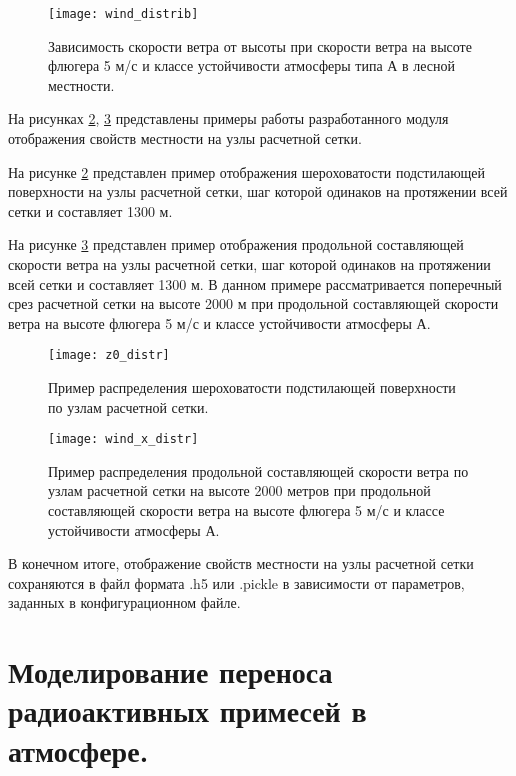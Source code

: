 \begin{figure}[ht]
    \centering
    \texttt{[image: wind\_distrib]}
    \captionsetup{justification=centering}
    \caption{Зависимость скорости ветра от высоты при скорости ветра на высоте флюгера 5 м/с и классе устойчивости 
        атмосферы типа А в лесной местности.}
    \label{fig_wind_distrib}
\end{figure}

На рисунках \ref{fig_z0_distrib}, \ref{fig_wind_x_distrib} представлены примеры работы разработанного модуля отображения 
свойств местности на узлы расчетной сетки. 

На рисунке \ref{fig_z0_distrib} представлен пример отображения шероховатости подстилающей поверхности на узлы расчетной 
сетки, шаг которой одинаков на протяжении всей сетки и составляет 1300 м.

На рисунке \ref{fig_wind_x_distrib} представлен пример отображения продольной составляющей скорости ветра на узлы 
расчетной сетки, шаг которой одинаков на протяжении всей сетки и составляет 1300 м. В данном примере рассматривается 
поперечный срез расчетной сетки на высоте 2000 м при продольной составляющей скорости ветра на высоте флюгера 5 м/с и 
классе устойчивости атмосферы А.

\begin{figure}[ht]
    \centering
    \texttt{[image: z0\_distr]}
    \captionsetup{justification=centering}
    \caption{Пример распределения шероховатости подстилающей поверхности по узлам расчетной сетки.}
    \label{fig_z0_distrib}
\end{figure}

\begin{figure}[ht]
    \centering
    \texttt{[image: wind\_x\_distr]}
    \captionsetup{justification=centering}
    \caption{Пример распределения продольной составляющей скорости ветра по узлам расчетной сетки на высоте 2000 метров 
        при продольной составляющей скорости ветра на высоте флюгера 5 м/с и классе устойчивости атмосферы А.}
    \label{fig_wind_x_distrib}
\end{figure}

В конечном итоге, отображение свойств местности на узлы расчетной сетки сохраняются в файл формата .h5 или .pickle в 
зависимости от параметров, заданных в конфигурационном файле. 

\section{Моделирование переноса радиоактивных примесей в атмосфере.}

